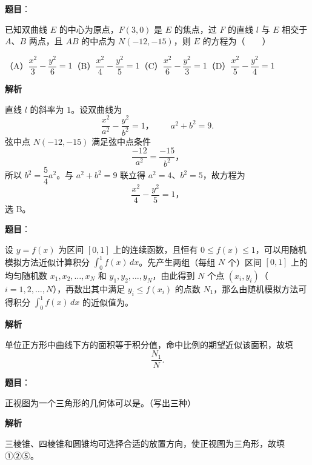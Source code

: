 \begin{answer}

\textbf{题目}：

已知双曲线 $E$ 的中心为原点，$F(3,0)$ 是 $E$ 的焦点，过 $F$ 的直线 $l$ 与 $E$ 相交于 $A\text{、}B$ 两点，且 $AB$ 的中点为 $N(-12,-15)$，则 $E$ 的方程为\mbox{（　　）}

（A）$\dfrac{x^2}{3}-\dfrac{y^2}{6}=1$\quad（B）$\dfrac{x^2}{4}-\dfrac{y^2}{5}=1$\quad（C）$\dfrac{x^2}{6}-\dfrac{y^2}{3}=1$\quad（D）$\dfrac{x^2}{5}-\dfrac{y^2}{4}=1$

\textbf{解析}

直线 $l$ 的斜率为 $1$。设双曲线为
\nopagebreak[4]
\[
\frac{x^2}{a^2}-\frac{y^2}{b^2}=1\text{，}\qquad a^2+b^2=9.
\]
弦中点 $N(-12,-15)$ 满足弦中点条件
\nopagebreak[4]
\[
\frac{-12}{a^2}=\frac{-15}{b^2}\text{，}
\]
所以 $b^2=\dfrac54a^2$。与 $a^2+b^2=9$ 联立得 $a^2=4\text{、}b^2=5$，故方程为
\nopagebreak[4]
\[
\frac{x^2}{4}-\frac{y^2}{5}=1\text{，}
\]
选 B。


\end{answer}
\begin{answer}

\textbf{题目}：

设 $y=f(x)$ 为区间 $[0,1]$ 上的连续函数，且恒有 $0\leq f(x)\leq1$，可以用随机模拟方法近似计算积分 $\displaystyle\int_0^1f(x)\,dx$。先产生两组（每组 $N$ 个）区间 $[0,1]$ 上的均匀随机数 $x_1,x_2,\ldots,x_N$ 和 $y_1,y_2,\ldots,y_N$，由此得到 $N$ 个点 $(x_i,y_i)$（$i=1,2,\ldots,N$），再数出其中满足 $y_i\leq f(x_i)$ 的点数 $N_1$，那么由随机模拟方法可得积分 $\displaystyle\int_0^1f(x)\,dx$ 的近似值为\gkblank{}。

\textbf{解析}

单位正方形中曲线下方的面积等于积分值，命中比例的期望近似该面积，故填
\nopagebreak[4]
\[
\frac{N_1}{N}.
\]


\end{answer}
\begin{answer}

\textbf{题目}：

正视图为一个三角形的几何体可以是\gkblank{}。（写出三种）

\textbf{解析}

三棱锥、四棱锥和圆锥均可选择合适的放置方向，使正视图为三角形，故填 ①②⑤。


\end{answer}
